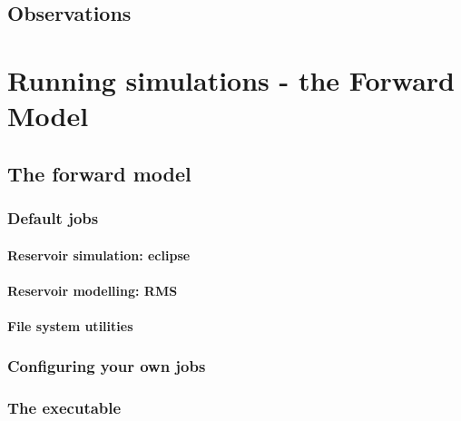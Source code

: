 \documentclass[letterpaper,10pt,english]{sphinxmanual}
\begin{document}
\section{Observations}
\label{\detokenize{data_types/index:observations}}

\chapter{Running simulations - the Forward Model}
\label{\detokenize{forward_model/index::doc}}\label{\detokenize{forward_model/index:running-simulations-the-forward-model}}

\section{The forward model}
\label{\detokenize{forward_model/index:the-forward-model}}

\subsection{Default jobs}
\label{\detokenize{forward_model/index:default-jobs}}

\subsubsection{Reservoir simulation: eclipse}
\label{\detokenize{forward_model/index:reservoir-simulation-eclipse}}

\subsubsection{Reservoir modelling: RMS}
\label{\detokenize{forward_model/index:reservoir-modelling-rms}}

\subsubsection{File system utilities}
\label{\detokenize{forward_model/index:file-system-utilities}}

\subsection{Configuring your own jobs}
\label{\detokenize{forward_model/index:configuring-your-own-jobs}}

\subsection{The  executable}
\label{\detokenize{forward_model/index:the-job-dispatch-executable}}
\end{document}
